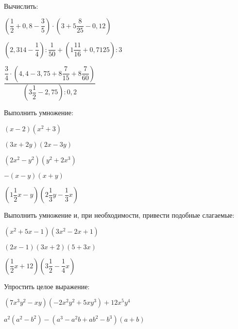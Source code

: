 \documentclass[12pt, a4paper]{article}
\begin{document}
	\begin{enumcols}[label=\textbf{\arabic*.}]
		\item Вычислить:
		\begin{enumcols}[itemcolumns=2]
			\item \( \left( \dfrac{1}{2}+0,8-\dfrac{3}{5}\right)\cdot\left( 3+5\dfrac{8}{25}-0,12 \right) \)
			\item \( \left( 2,314-\dfrac{1}{4} \right):\dfrac{1}{50}+\left( 1\dfrac{11}{16}+0,7125 \right):3 \)
			\item \( \dfrac{\dfrac{3}{4}\cdot\left( 4,4-3,75+8\dfrac{7}{15}+8\dfrac{7}{60} \right)}{\left( 3\dfrac{1}{2}-2,75 \right):0,2} \)
		\end{enumcols}
		\item Выполнить умножение:
		\begin{enumcols}[itemcolumns=3]
			\item \( (x-2)(x^2+3) \)
			\item \( (3x+2y)(2x-3y) \)
			\item \( (2x^2-y^2)(y^2+2x^3) \)
			\item \( -(x-y)(x+y) \)
			\item \( \left( 1\dfrac{1}{2}x-y \right)\left( 2\dfrac{1}{3}y-\dfrac{1}{3}x \right) \)
		\end{enumcols}
		\item Выполнить умножение и, при необходимости, привести подобные слагаемые:
		\begin{enumcols}[itemcolumns=2]
			\item \( (x^2+5x-1)(3x^2-2x+1) \)
			\item \( (2x-1)(3x+2)(5+3x) \)
			\item \( \left( \dfrac{1}{2}x+12 \right)\left( 3\dfrac{1}{2}-\dfrac{1}{4}x \right) \)
		\end{enumcols}
		\item Упростить целое выражение:
		\begin{enumcols}[itemcolumns=2]
			\item \( (7x^3y^2-xy)(-2x^2y^2+5xy^3)+12x^5y^4 \)
			\item \( a^2(a^2-b^2)-(a^3-a^2b+ab^2-b^3)(a+b) \)
		\end{enumcols}
	\end{enumcols}
\end{document}
